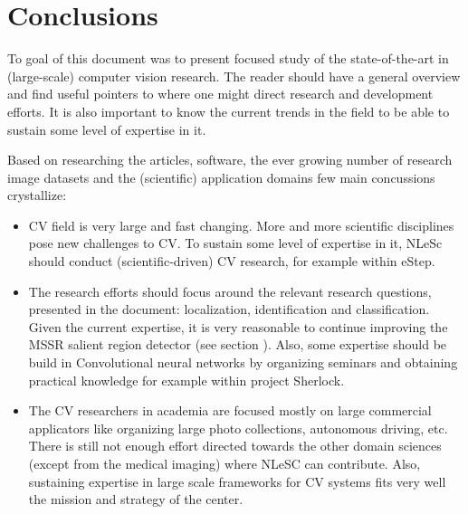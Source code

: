 \section{Conclusions}
\label{sec:conc}

To goal of  this document was to present focused study of the state-of-the-art in (large-scale) computer vision research. The reader should have a general overview and find useful pointers to where one might direct research and development efforts. It is also important to know the current trends in the field to be able to sustain some level of expertise in it.

Based on researching the articles, software, the ever growing number of research image datasets and the (scientific) application domains few main concussions crystallize:

\begin{itemize}
\item{CV field is very large and fast changing. More and more scientific disciplines pose new challenges to CV. To sustain some level of expertise in it, NLeSc should conduct (scientific-driven) CV research, for example within eStep.}
\item{The research efforts should focus around the relevant research questions, presented in the document: localization, identification and classification. Given the current expertise, it is very reasonable to continue improving the MSSR salient region detector (see section \underline{}). Also, some expertise should be build in Convolutional neural networks by organizing seminars and obtaining practical knowledge for example within project Sherlock.}
\item{The CV researchers in academia are focused mostly on large commercial applicators like organizing large photo collections, autonomous driving, etc. There is still not enough effort directed towards the other domain sciences (except from the medical imaging) where NLeSC can contribute. Also, sustaining expertise in large scale frameworks for CV systems fits very well the mission and strategy of the center.}

\end{itemize}

